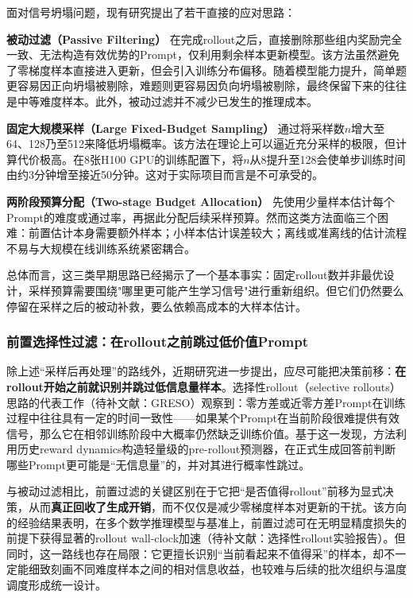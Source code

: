 面对信号坍塌问题，现有研究提出了若干直接的应对思路：

\textbf{被动过滤（Passive Filtering）} 在完成rollout之后，直接删除那些组内奖励完全一致、无法构造有效优势的Prompt，仅利用剩余样本更新模型。该方法虽然避免了零梯度样本直接进入更新，但会引入训练分布偏移。随着模型能力提升，简单题更容易因正向坍塌被剔除，难题则更容易因负向坍塌被剔除，最终保留下来的往往是中等难度样本。此外，被动过滤并不减少已发生的推理成本。

\textbf{固定大规模采样（Large Fixed-Budget Sampling）} 通过将采样数$n$增大至64、128乃至512来降低坍塌概率。该方法在理论上可以逼近充分采样的极限，但计算代价极高。在8张H100 GPU的训练配置下，将$n$从8提升至128会使单步训练时间由约3分钟增至接近50分钟。这对于实际项目而言是不可承受的。

\textbf{两阶段预算分配（Two-stage Budget Allocation）} 先使用少量样本估计每个Prompt的难度或通过率，再据此分配后续采样预算。然而这类方法面临三个困难：前置估计本身需要额外样本；小样本估计误差较大；离线或准离线的估计流程不易与大规模在线训练系统紧密耦合。

总体而言，这三类早期思路已经揭示了一个基本事实：固定rollout数并非最优设计，采样预算需要围绕"哪里更可能产生学习信号"进行重新组织。但它们仍然要么停留在采样之后的被动补救，要么依赖高成本的大样本估计。

\subsubsection{前置选择性过滤：在rollout之前跳过低价值Prompt}
\label{subsubsec:pre_rollout_filtering}

除上述“采样后再处理”的路线外，近期研究进一步提出，应尽可能把决策前移：\textbf{在rollout开始之前就识别并跳过低信息量样本}。选择性rollout（selective rollouts）思路的代表工作（待补文献：GRESO）观察到：零方差或近零方差Prompt在训练过程中往往具有一定的时间一致性——如果某个Prompt在当前阶段很难提供有效信号，那么它在相邻训练阶段中大概率仍然缺乏训练价值。基于这一发现，方法利用历史reward dynamics构造轻量级的pre-rollout预测器，在正式生成回答前判断哪些Prompt更可能是“无信息量”的，并对其进行概率性跳过。

与被动过滤相比，前置过滤的关键区别在于它把“是否值得rollout”前移为显式决策，从而\textbf{真正回收了生成开销}，而不仅仅是减少零梯度样本对更新的干扰。该方向的经验结果表明，在多个数学推理模型与基准上，前置过滤可在无明显精度损失的前提下获得显著的rollout wall-clock加速（待补文献：选择性rollout实验报告）。但同时，这一路线也存在局限：它更擅长识别“当前看起来不值得采”的样本，却不一定能细致刻画不同难度样本之间的相对信息收益，也较难与后续的批次组织与温度调度形成统一设计。


